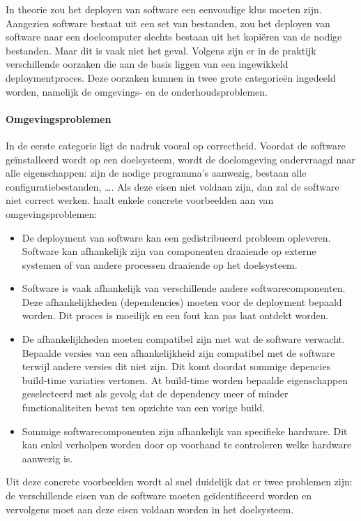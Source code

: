 In theorie zou het deployen van software een eenvoudige klus moeten zijn.
Aangezien software bestaat uit een set van bestanden, zou het deployen van software naar een doelcomputer slechts bestaan uit het kopiëren van de nodige bestanden.
Maar dit is vaak niet het geval.
Volgens \citet{dolstra2006purely} zijn er in de praktijk verschillende oorzaken die aan de basis liggen van een ingewikkeld deploymentproces.
Deze oorzaken kunnen in twee grote categorieën ingedeeld worden, namelijk de omgevings- en de onderhoudsproblemen.

\paragraph{Omgevingsproblemen}
In de eerste categorie ligt de nadruk vooral op correctheid.
Voordat de software geïnstalleerd wordt op een doelsysteem, wordt de doelomgeving ondervraagd naar alle eigenschappen: zijn de nodige programma's aanwezig, bestaan alle configuratiebestanden, \ldots .
Als deze eisen niet voldaan zijn, dan zal de software niet correct werken.
\citet{dolstra2006purely} haalt enkele concrete voorbeelden aan van omgevingsproblemen:
\begin{itemize}
\item De deployment van software kan een gedistribueerd probleem opleveren.
Software kan afhankelijk zijn van componenten draaiende op externe systemen of van andere processen draaiende op het doelsysteem.  
\item Software is vaak afhankelijk van verschillende andere softwarecomponenten. 
Deze afhankelijkheden (dependencies) moeten voor de deployment bepaald worden.
Dit proces is moeilijk en een fout kan pas laat ontdekt worden.
\item De afhankelijkheden moeten compatibel zijn met wat de software verwacht.
Bepaalde versies van een afhankelijkheid zijn compatibel met de software terwijl andere versies dit niet zijn.
Dit komt doordat sommige depencies build-time variaties vertonen.
At build-time worden bepaalde eigenschappen geselecteerd met als gevolg dat de dependency meer of minder functionaliteiten bevat ten opzichte van een vorige build.
\item Sommige softwarecomponenten zijn afhankelijk van specifieke hardware.
Dit kan enkel verholpen worden door op voorhand te controleren welke hardware aanwezig is.
\end{itemize}

Uit deze concrete voorbeelden wordt al snel duidelijk dat er twee problemen zijn: de verschillende eisen van de software moeten geïdentificeerd worden en vervolgens moet aan deze eisen voldaan worden in het doelsysteem.

